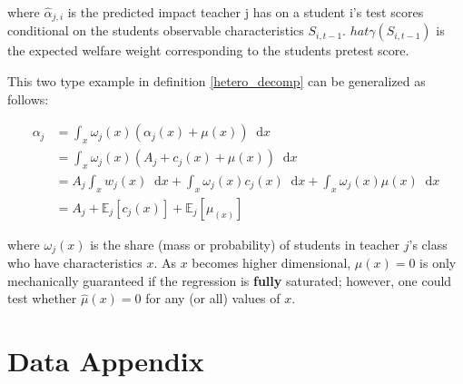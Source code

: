 \documentclass[12pt]{article}
\theoremstyle{definition}
\theoremstyle{definition}
\theoremstyle{definition}
\theoremstyle{definition}
\newcommand*\diff{\mathop{}\!\mathrm{d}}
\begin{document}
    where $\hat{\alpha}_{j,i}$ is the predicted impact teacher j has on a student i's test scores conditional on the students observable characteristics $S_{i,t-1}$. $hat{\gamma}(S_{i,t-1})$ is the expected welfare weight corresponding to the students pretest score. 

    
    This two type example in definition \ref{hetero_decomp} can be generalized as follows: 

    \begin{align*}
                 \alpha_j  &= \int_x \omega_j(x)(\alpha_j(x) + \mu(x)) \diff x \\
                  &= \int_x \omega_j(x)(A_j + c_j(x) + \mu(x)) \diff x \\
                  &= A_j \int_x w_j(x) \diff x + \int_x \omega_j(x) c_j(x)\diff x + \int_x \omega_j(x) \mu(x)\diff x \\
                  &= A_j  + \mathbb{E}_j[c_j(x)] + \mathbb{E}_j[\mu_(x)] 
    \end{align*}

    
    \noindent where $\omega_j(x)$ is the share (mass or probability) of students in teacher $j$'s class who have characteristics $x$. As $x$ becomes higher dimensional, $\mu(x)=0$ is only mechanically guaranteed if the regression is \textbf{fully} saturated; however, one could test whether $\hat{\mu}(x)=0$ for any (or all) values of $x$.






\appendix
\captionsetup{labelformat=AppendixTables}


\setcounter{figure}{0}   
\setcounter{table}{0}   

\renewcommand{\thetable}{\arabic{table}}
\renewcommand{\thefigure}{\arabic{figure}}



\section{Data Appendix} \label{data_app}
\end{document}
